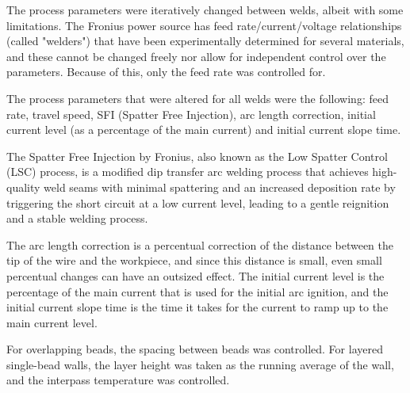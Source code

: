 The process parameters were iteratively changed between welds, albeit with some limitations. The Fronius power source has feed rate/current/voltage relationships (called "welders") that have been experimentally determined for several materials, and these cannot be changed freely nor allow for independent control over the parameters. Because of this, only the feed rate was controlled for.

The process parameters that were altered for all welds were the following: feed rate, travel speed, SFI (Spatter Free Injection), arc length correction, initial current level (as a percentage of the main current) and initial current slope time.

The Spatter Free Injection by Fronius, also known as the Low Spatter Control (LSC) process, is a modified dip transfer arc welding process that achieves high-quality weld seams with minimal spattering and an increased deposition rate by triggering the short circuit at a low current level, leading to a gentle reignition and a stable welding process.

The arc length correction is a percentual correction of the distance between the tip of the wire and the workpiece, and since this distance is small, even small percentual changes can have an outsized effect. The initial current level is the percentage of the main current that is used for the initial arc ignition, and the initial current slope time is the time it takes for the current to ramp up to the main current level.

For overlapping beads, the spacing between beads was controlled. For layered single-bead walls, the layer height was taken as the running average of the wall, and the interpass temperature was controlled.



